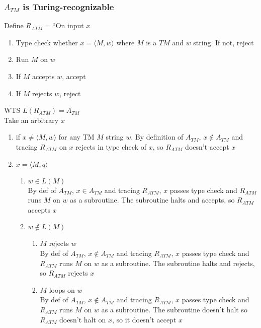 \documentclass{article}
\begin{document}
    \subsubsection{$A_{TM}$ is Turing-recognizable}
    Define $R_{ATM}=$``On input $x$
    \begin{enumerate}
        \item Type check whether $x=\langle M,w \rangle$ where $M$ is a $TM$ and $w$ string. If not, reject
        \item Run $M$ on $w$
        \item If $M$ accepts $w$, accept
        \item If $M$ rejects $w$, reject
    \end{enumerate}
    WTS $L(R_{ATM})=A_{TM}$\\
    Take an arbitrary $x$
    \begin{enumerate}
        \item if $x\neq\langle M,w\rangle$ for any TM $M$ string $w$. By definition of $A_{TM}$, $x\notin A_{TM}$ and tracing $R_{ATM}$ on $x$ rejects in type check of $x$, so $R_{ATM}$ doesn't accept $x$
        \item $x=\langle M,q\rangle$
        \begin{enumerate}
            \item $w\in L(M)$\\
            By def of $A_{TM}$, $x\in A_{TM}$ and tracing $R_{ATM}$, $x$ passes type check and $R_{ATM}$ runs $M$ on $w$ as a subroutine. The subroutine halts and accepts, so $R_{ATM}$ accepts $x$
            \item $w\notin L(M)$
            \begin{enumerate}
                \item $M$ rejects $w$\\
                By def of $A_{TM}$, $x\notin A_{TM}$ and tracing $R_{ATM}$, $x$ passes type check and $R_{ATM}$ runs $M$ on $w$ as a subroutine. The subroutine halts and rejects, so $R_{ATM}$ rejects $x$
                \item $M$ loops on $w$\\
                By def of $A_{TM}$, $x\notin A_{TM}$ and tracing $R_{ATM}$, $x$ passes type check and $R_{ATM}$ runs $M$ on $w$ as a subroutine. The subroutine doesn't halt so $R_{ATM}$ doesn't halt on $x$, so it doesn't accept $x$
            \end{enumerate}
        \end{enumerate}
    \end{enumerate}
\end{document}
